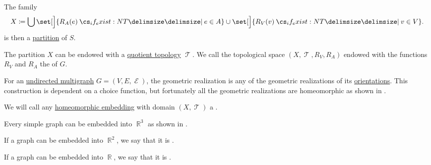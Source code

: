 \begin{definition}
  The family
  \begin{equation*}
    X \coloneqq \bigcup \set[\Big]{ R_A(e) \given* e \in A } \cup \set[\Big]{ R_V(v) \given* v \in V }.
  \end{equation*}
  is then a \hyperref[def:set_partition]{partition} of \( S \).

  The partition \( X \) can be endowed with a \hyperref[def:topological_quotient]{quotient topology} \( \mscrT \). We call the topological space \( (X, \mscrT, R_V, R_A) \) endowed with the functions \( R_V \) and \( R_A \) the  of \( G \).

  \begin{thmenum}
     For an \hyperref[def:undirected_multigraph]{undirected multigraph} \( G = (V, E, \mscrE) \), the geometric realization is any of the geometric realizations of its \hyperref[def:multigraph_orientation]{orientations}. This construction is dependent on a choice function, but fortunately all the geometric realizations are homeomorphic as shown in .

     We will call any \hyperref[def:homeomorphism]{homeomorphic embedding} with domain \( (X, \mscrT) \) a .

    Every simple graph can be embedded into \( \BbbR^3 \) as shown in .

     If a graph can be embedded into \( \BbbR^2 \), we say that it is .

     If a graph can be embedded into \( \BbbR \), we say that it is .
  \end{thmenum}
\end{definition}

